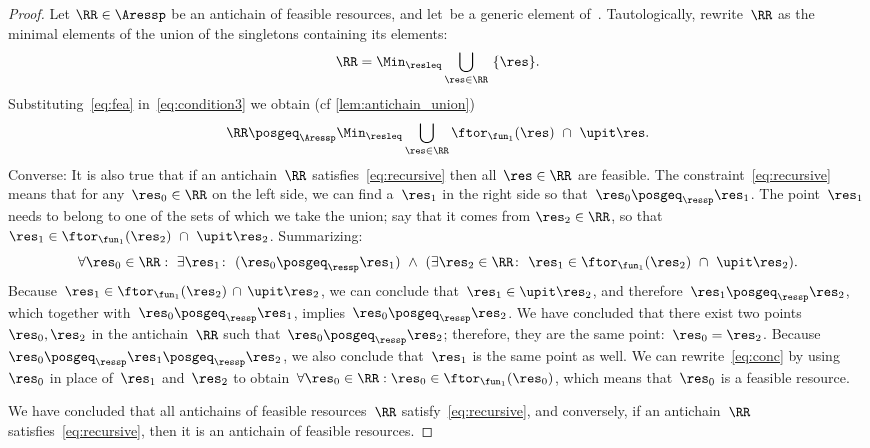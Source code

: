 \begin{proof}
    Let $\RR\in\Aressp$ be an antichain of feasible resources, and let~\res be a generic element of~\ressp.
    Tautologically, rewrite~$\RR$ as the minimal elements of the union of the singletons containing its elements:
    \begin{equation}
        \RR=\Min_{\resleq}\bigcup_{\res\in\RR}\ \{\res\}.
        \label{eq:condition3}
    \end{equation}
    Substituting~\cref{eq:fea} in~\cref{eq:condition3} we obtain (cf
    \cref{lem:antichain_union})
    \begin{equation}
        \RR\posgeq_{\Aressp}\Min_{\resleq}\bigcup_{\res\in\RR}\ftor_{\fun_{1}}(\res)\ \cap\ \upit\res.
        \label{eq:recursive}
    \end{equation}
    Converse: It is also true that if an antichain~$\RR$ satisfies~\cref{eq:recursive} then all~$\res\in\RR$ are feasible.
    The constraint~\cref{eq:recursive} means that for any~$\res_{0}\in\RR$ on the left side, we can find a~$\res_{1}$ in the right side so that~$\res_{0}\posgeq_{\ressp}\res_{1}$.
    The point~$\res_{1}$ needs to belong to one of the sets of which we take the union; say that it comes from $\res_{2}\in\RR$, so that $\res_{1}\in\ftor_{\fun_{1}}(\res_{2})\ \cap\ \upit\res_{2}$.
    Summarizing:
    \begin{equation}
        \forall\res_{0}\in\RR:\ \exists\res_{1}\colon\ (\res_{0}\posgeq_{\ressp}\res_{1})\ \wedge\ (\exists\res_{2}\in\RR\colon\ \res_{1}\in\ftor_{\fun_{1}}(\res_{2})\ \cap\ \upit\res_{2}).
        \label{eq:conc}
    \end{equation}
    Because~$\res_{1}\in\ftor_{\fun_{1}}(\res_{2})\,\cap\,\upit\res_{2}$, we can conclude that~$\res_{1}\in\upit\res_{2}$, and therefore~$\res_{1}\posgeq_{\ressp}\res_{2}$, which together with~$\res_{0}\posgeq_{\ressp}\res_{1}$, implies~$\res_{0}\posgeq_{\ressp}\res_{2}$.
    We have concluded that there exist two points~$\res_{0},\res_{2}$ in the antichain~$\RR$ such that~$\res_{0}\posgeq_{\ressp}\res_{2}$; therefore, they are the same point:~$\res_{0}=\res_{2}$.
    Because~$\res_{0}\posgeq_{\ressp}\res_{1}\posgeq_{\ressp}\res_{2}$, we also conclude that~$\res_{1}$ is the same point as well.
    We can rewrite~\cref{eq:conc} by using~$\res_{0}$ in place of~$\res_{1}$ and~$\res_{2}$ to obtain~$\forall\res_{0}\in\RR:\res_{0}\in\ftor_{\fun_{1}}(\res_{0})$,
    which means that~$\res_{0}$ is a feasible resource.

    We have concluded that all antichains of feasible resources~$\RR$ satisfy~\cref{eq:recursive}, and conversely, if an antichain~$\RR$ satisfies~\cref{eq:recursive}, then it is an antichain of feasible resources.


\end{proof}
